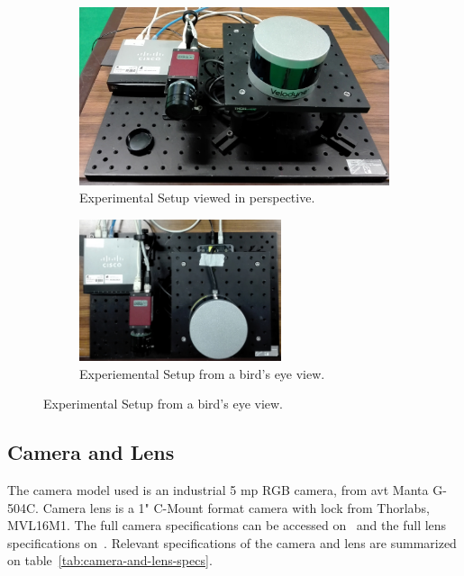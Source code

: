 \begin{figure}[H]
	\centering
	\begin{subfigure}[c]{0.45\textwidth}
		\includegraphics[width=\textwidth]{img/experimental-setup/table-setup-cambada-perspective.jpg}
		\caption{Experimental Setup viewed in perspective.}
		\label{fig:experimental-setup:perspective}
	\end{subfigure}
	\qquad
	\begin{subfigure}[c]{0.45\textwidth}
		\includegraphics[width=0.65\textwidth, keepaspectratio, angle=90]{img/experimental-setup/table-setup-cambada-birds-eye.jpg}
		\caption{Experiemental Setup from a bird's eye view.}
		\label{fig:experimental-setup:birds-eye}
	\end{subfigure}
	\caption{Experimental Setup from a bird's eye view.}
	\label{fig:experimental-setup}
\end{figure}

\subsection{Camera and Lens}
The camera model used is an industrial 5 \ac{mp} RGB camera, from \ac{avt}  Manta G-504C. Camera lens is a 1" C-Mount format camera with lock from Thorlabs\cp, MVL16M1. The full camera specifications can be accessed on~\cite{MantaG504C} and the full lens specifications on~\cite{Thorlabs}. Relevant specifications of the camera and lens are summarized  on table~\ref{tab:camera-and-lens-specs}. 

